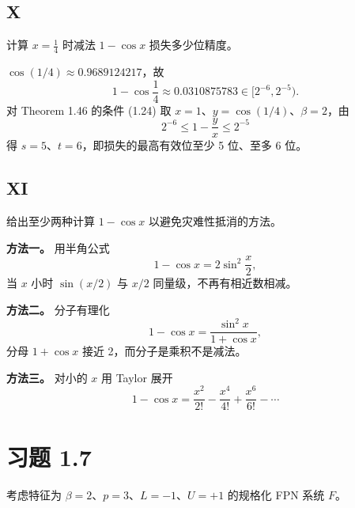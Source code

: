 \documentclass{article}
\begin{document}
\subsection*{X}

计算 $x = \frac{1}{4}$ 时减法 $1 - \cos x$ 损失多少位精度。

\begin{solution}
  $\cos(1/4) \approx 0.9689124217$，故
  \[
    1 - \cos\frac{1}{4} \approx 0.0310875783 \in [2^{-6}, 2^{-5}).
  \]
  对 Theorem 1.46 的条件 (1.24) 取 $x = 1$、$y = \cos(1/4)$、$\beta = 2$，由
  \[
    2^{-6} \le 1 - \frac{y}{x} \le 2^{-5}
  \]
  得 $s = 5$、$t = 6$，即损失的最高有效位至少 5 位、至多 6 位。
\end{solution}

\subsection*{XI}

给出至少两种计算 $1 - \cos x$ 以避免灾难性抵消的方法。

\begin{solution}
  \textbf{方法一。} 用半角公式
  \[
    1 - \cos x = 2 \sin^{2} \frac{x}{2},
  \]
  当 $x$ 小时 $\sin(x/2)$ 与 $x/2$ 同量级，不再有相近数相减。

  \textbf{方法二。} 分子有理化
  \[
    1 - \cos x = \frac{\sin^{2} x}{1 + \cos x},
  \]
  分母 $1 + \cos x$ 接近 2，而分子是乘积不是减法。

  \textbf{方法三。} 对小的 $x$ 用 Taylor 展开
  \[
    1 - \cos x = \frac{x^{2}}{2!} - \frac{x^{4}}{4!} + \frac{x^{6}}{6!} - \cdots
  \]
\end{solution}

\section{习题 1.7}

考虑特征为 $\beta = 2$、$p = 3$、$L = -1$、$U = +1$ 的规格化 FPN 系统 $F$。
\end{document}
